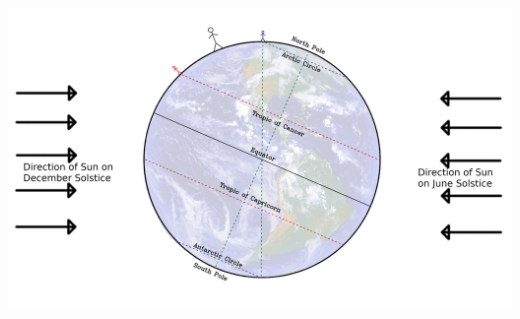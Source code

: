 \documentclass[12pt]{article}
\begin{document}
\newpage
\begin{landscape}
	
	\includegraphics[width=10in]{earth-diagram-both.png}
	

	
\end{landscape}

	
\end{document}
